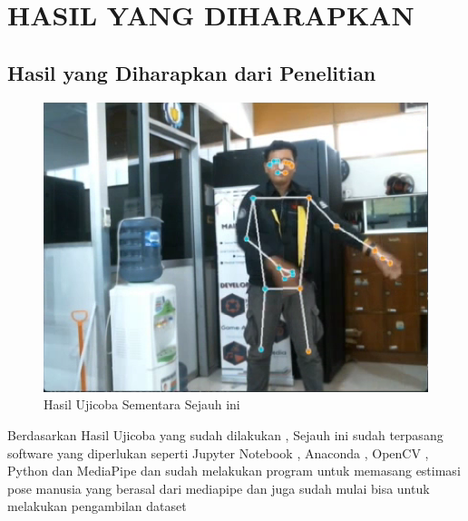 \chapter{HASIL YANG DIHARAPKAN}

\section{Hasil yang Diharapkan dari Penelitian}

\begin{figure} [ht] \centering
    \includegraphics[scale=0.5]{gambar/contoh.png}
    \caption{Hasil Ujicoba Sementara Sejauh ini}
    \label{fig:Ujicoba Sementara}
  \end{figure}

Berdasarkan Hasil Ujicoba yang sudah dilakukan , Sejauh ini sudah terpasang software yang diperlukan seperti Jupyter Notebook , Anaconda , OpenCV , Python dan MediaPipe dan sudah melakukan program untuk memasang estimasi pose manusia yang berasal dari mediapipe dan juga sudah mulai bisa untuk melakukan pengambilan dataset
